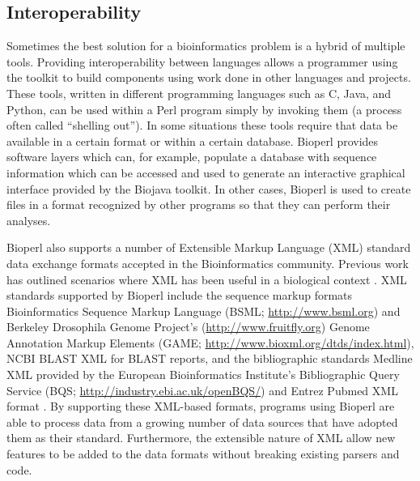 \documentclass[12pt]{article}
\begin{document}
\subsection{Interoperability}

Sometimes the best solution for a bioinformatics problem is a hybrid
of multiple tools.  Providing interoperability between languages
allows a programmer using the toolkit to build components using work
done in other languages and projects.  These tools, written in
different programming languages such as C, Java, and Python, can be
used within a Perl program simply by invoking them (a process often
called ``shelling out'').  In some situations these tools require that
data be available in a certain format or within a certain database.
Bioperl provides software layers which can, for example, populate a
database with sequence information which can be accessed and used to
generate an interactive graphical interface provided by the Biojava
toolkit.  In other cases, Bioperl is used to create files in a format
recognized by other programs so that they can perform their analyses.

Bioperl also supports a number of Extensible Markup Language (XML)
standard data exchange formats accepted in the Bioinformatics
community.  Previous work has outlined scenarios where XML has been
useful in a biological context \cite{xmlbioinformatics}.  XML
standards supported by Bioperl include the sequence markup formats
Bioinformatics Sequence Markup Language (BSML;
\url{http://www.bsml.org}) and Berkeley Drosophila Genome Project's
(\url{http://www.fruitfly.org}) Genome Annotation Markup Elements
(GAME; \url{http://www.bioxml.org/dtds/index.html}), NCBI BLAST XML
for BLAST reports, and the bibliographic standards Medline XML
provided by the European Bioinformatics Institute's Bibliographic
Query Service (BQS; \url{http://industry.ebi.ac.uk/openBQS/}) and
Entrez Pubmed XML format \cite{entrez}.  By supporting these XML-based
formats, programs using Bioperl are able to process data from a
growing number of data sources that have adopted them as their standard.
Furthermore, the extensible nature of XML allow new features to be added
to the data formats without breaking existing parsers and code.
\end{document}
